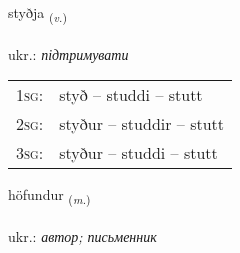 \documentclass[frontgrid, backgrid]{flacards}\usepackage[]{graphicx}\usepackage[]{xcolor}
\begin{document}
{styðja \small{\textsubscript{(\textit{v.})}} \\[1ex] %
\textphonetic{[stɪðja]} \\
ukr.: \emph{підтримувати} \\  [2ex]
\renewcommand*{\arraystretch}{0.8}
\begin{tabular}{p{1cm}l}
\textsc{1sg}: & styð -- studdi -- stutt \\ 
\textsc{2sg}: & styður -- studdir -- stutt \\ 
\textsc{3sg}: & styður -- studdi -- stutt \\ 
\end{tabular}
}

\renewcommand{\flhead}{\vskip5pt \fboxsep=0pt {\small\bfseries\footnotesize Nafnorð | іменник}}
\renewcommand{\fcfoot}{\vskip5pt \fboxsep=0pt \hspace{2pt}{\small\bfseries\footnotesize 1K}}

\renewcommand{\blhead}{\vskip5pt {\small\bfseries\footnotesize Nafnorð | іменник }}
\renewcommand{\bcfoot}{\vskip5pt \hspace{2pt}{\small\bfseries\footnotesize 1K}}


{höfundur \small{\textsubscript{(\textit{m.})}} \\[1ex] %
\textphonetic{[hœːvʏntʏr]} \\
ukr.: \emph{автор; письменник} \\  [2ex]
\renewcommand*{\arraystretch}{0.8}
}

\renewcommand{\flhead}{\vskip5pt \fboxsep=0pt {\small\bfseries\footnotesize Nafnorð | іменник}}
\renewcommand{\fcfoot}{\vskip5pt \fboxsep=0pt \hspace{2pt}{\small\bfseries\footnotesize 1K}}
\end{document}
